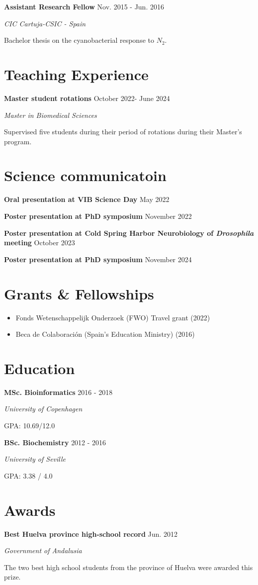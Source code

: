 \documentclass[paper=a4,fontsize=11pt]{article}
\newcommand{\NewPart}[1]{
\vspace{-15pt}
\section*{
{#1}}}
\newcommand{\Entry}[4]{
		\noindent \textbf{#1} \hfill      %
		{\color{gray}\textsf{#2}} \par                  %
		\noindent \textit{#3} \par        %
		  \noindent \small #4  %
		\normalsize \par \vspace{7.5pt}}
\newcommand{\ShortEntry}[4]{
		\noindent \textbf{#1} \hfill      %
		{\color{gray}\textsf{#2}} \par                  %
		  \noindent \small #3  %
		\normalsize \par \vspace{7.5pt}}
\begin{document}
\Entry{Assistant Research Fellow}{Nov. 2015 - Jun. 2016}{CIC Cartuja-CSIC  - Spain}{Bachelor thesis on the cyanobacterial response to $N_2$.}



\nocite{Dopp2024} \nocite{Chowdhury2023}

\printbibliography[title={Publications}]

\NewPart{Teaching Experience}

\Entry{Master student rotations}{October 2022- June 2024}{Master in Biomedical Sciences}{Supervised five students during their period of rotations during their Master's program.}


\NewPart{Science communicatoin}

\ShortEntry{Oral presentation at VIB Science Day}{May 2022}{}{}
\ShortEntry{Poster presentation at PhD symposium}{November 2022}{}{}
\ShortEntry{Poster presentation at Cold Spring Harbor Neurobiology of \textit{Drosophila} meeting}{October 2023}{}{}
\ShortEntry{Poster presentation at PhD symposium}{November 2024}{}{}




\NewPart{Grants \& Fellowships}

\begin{itemize}
\item Fonds Wetenschappelijk Onderzoek (FWO) Travel grant (2022)
\item Beca de Colaboraci\'on (Spain's Education Ministry) (2016)
\end{itemize}


\NewPart{Education}

\Entry{MSc. Bioinformatics}{2016 - 2018}{University of Copenhagen}{GPA: 10.69/12.0}
\Entry{BSc. Biochemistry}{2012 - 2016}{University of Seville}{GPA: 3.38 / 4.0}


\thispagestyle{plain}

\NewPart{Awards}

\Entry{Best Huelva province high-school record}{Jun. 2012}{Government of Andalusia}{The two best high school students from the province of Huelva were awarded this prize.}

\end{document}

